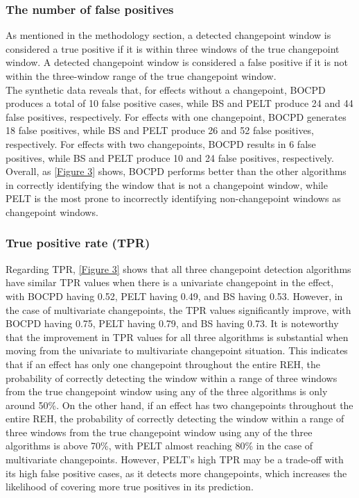 \documentclass[]{interact}
\theoremstyle{plain}%
\theoremstyle{definition}
\theoremstyle{remark}
\begin{document}
{	
	\subsubsection{The number of false positives}
	
	\hspace{0.28cm} As mentioned in the methodology section, a detected changepoint window is considered a true positive if it is within three windows of the true changepoint window. A detected changepoint window is considered a false positive if it is not within the three-window range of the true changepoint window. \\
	
	The synthetic data reveals that, for effects without a changepoint, BOCPD produces a total of 10 false positive cases, while BS and PELT produce 24 and 44 false positives, respectively. For effects with one changepoint, BOCPD generates 18 false positives, while BS and PELT produce 26 and 52 false positives, respectively. For effects with two changepoints, BOCPD results in 6 false positives, while BS and PELT produce 10 and 24 false positives, respectively. Overall, as \autoref{Figure 3} shows, BOCPD performs better than the other algorithms in correctly identifying the window that is not a changepoint window, while PELT is the most prone to incorrectly identifying non-changepoint windows as changepoint windows.
	
	\subsubsection{True positive rate (TPR)}
	
	\hspace{0.28cm} Regarding TPR, \autoref{Figure 3} shows that all three changepoint detection algorithms have similar TPR values when there is a univariate changepoint in the effect, with BOCPD having 0.52, PELT having 0.49, and BS having 0.53. However, in the case of multivariate changepoints, the TPR values significantly improve, with BOCPD having 0.75, PELT having 0.79, and BS having 0.73. It is noteworthy that the improvement in TPR values for all three algorithms is substantial when moving from the univariate to multivariate changepoint situation. This indicates that if an effect has only one changepoint throughout the entire REH, the probability of correctly detecting the window within a range of three windows from the true changepoint window using any of the three algorithms is only around 50\%. On the other hand, if an effect has two changepoints throughout the entire REH, the probability of correctly detecting the window within a range of three windows from the true changepoint window using any of the three algorithms is above 70\%, with PELT almost reaching 80\% in the case of multivariate changepoints. However, PELT's high TPR may be a trade-off with its high false positive cases, as it detects more changepoints, which increases the likelihood of covering more true positives in its prediction.

}
\end{document}
